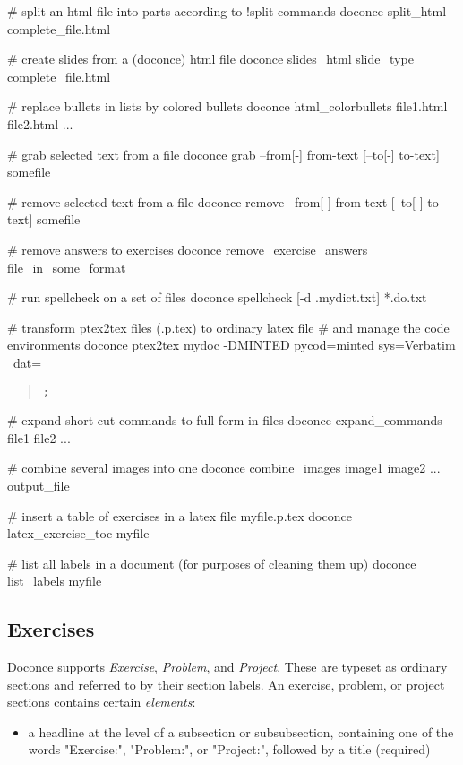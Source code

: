 \documentclass[%
oneside,                 %
final,                   %
chapterprefix=true,      %
open=right               %
10pt]{book}
\begin{document}
{# split an html file into parts according to !split commands
doconce split_html complete_file.html

# create slides from a (doconce) html file
doconce slides_html slide_type complete_file.html

# replace bullets in lists by colored bullets
doconce html_colorbullets file1.html file2.html ...

# grab selected text from a file
doconce grab   --from[-] from-text [--to[-] to-text] somefile

# remove selected text from a file
doconce remove --from[-] from-text [--to[-] to-text] somefile

# remove answers to exercises
doconce remove_exercise_answers file_in_some_format

# run spellcheck on a set of files
doconce spellcheck [-d .mydict.txt] *.do.txt

# transform ptex2tex files (.p.tex) to ordinary latex file
# and manage the code environments
doconce ptex2tex mydoc -DMINTED pycod=minted sys=Verbatim \
        dat=\begin{quote}\begin{verbatim};\end{verbatim}\end{quote}

# expand short cut commands to full form in files
doconce expand_commands file1 file2 ...

# combine several images into one
doconce combine_images image1 image2 ... output_file

# insert a table of exercises in a latex file myfile.p.tex
doconce latex_exercise_toc myfile

# list all labels in a document (for purposes of cleaning them up)
doconce list_labels myfile
\eshpro

\subsection{Exercises}

Doconce supports \emph{Exercise}, \emph{Problem}, and \emph{Project}. These are typeset
as ordinary sections and referred to by their section labels.
An exercise, problem, or project sections contains certain \emph{elements}:

\begin{itemize}
  \item a headline at the level of a subsection or subsubsection,
    containing one of the words "Exercise:", "Problem:", or
    "Project:", followed by a title (required)


\end{itemize}}
\end{document}
